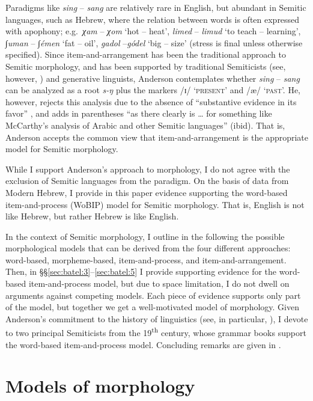 \documentclass[output=paper,
modfonts
]{LSP/langsci}
\begin{document}
Paradigms like \emph{sing} -- \emph{sang} are relatively rare in
English, but abundant in Semitic languages, such as Hebrew, where the
relation between words is often expressed with apophony; e.g.\ \emph{χam}
-- \emph{χom} `hot -- heat', \emph{limed} -- \emph{limud} `to teach --
learning', \emph{∫uman} -- \emph{∫émen} `fat -- oil', \emph{gadol}
--\emph{gódel} `big -- size' (stress is final unless otherwise
specified). Since item-and-arrangement has been the traditional approach
to Semitic morphology, and has been supported by traditional Semiticists
(see, however, ) and generative linguists, Anderson contemplates
whether \emph{sing} -- \emph{sang} can be analyzed as a root \emph{s-ŋ}
plus the markers /ɪ/ `\textsc{present}' and /æ/ `\textsc{past}'. He,
however, rejects this analysis due to the absence of ``substantive
evidence in its favor'' \citep[62]{anderson1992}, and adds in parentheses ``as
there clearly is \ldots{} for something like McCarthy's analysis of
Arabic and other Semitic languages'' (ibid). That is, Anderson accepts
the common view that item-and-arrangement is the appropriate model for
Semitic morphology.

While I support Anderson's approach to morphology, I do not agree with
the exclusion of Semitic languages from the paradigm. On the basis of
data from Modern Hebrew, I provide in this paper evidence supporting the
word-based item-and-process (WoBIP) model for Semitic morphology. That
is, English is not like Hebrew, but rather Hebrew is like English.

In the context of Semitic morphology, I outline in the following  the
possible morphological models that can be derived from the four
different approaches: word-based, morpheme-based, item-and-process, and
item-and-arrangement. Then, in §§\ref{sec:batel:3}--\ref{sec:batel:5} I provide supporting evidence for
the word-based item-and-process model, but due to space limitation, I do
not dwell on arguments against competing models. Each piece of evidence
supports only part of the model, but together we get a well-motivated
model of morphology. Given Anderson's commitment to the history of
linguistics (see, in particular, \citealt{anderson1985a}), I devote  to two
principal Semiticists from the 19\textsuperscript{th} century, whose
grammar books support the word-based item-and-process model. Concluding
remarks are given in .

\section{Models of morphology}\label{models-of-morphology}\label{sec:batel:2}%
\end{document}
